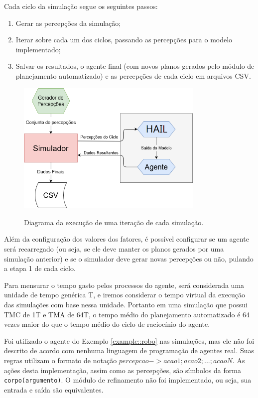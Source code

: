 Cada ciclo da simulação segue os seguintes passos:

\begin{enumerate}
    \item Gerar as percepções da simulação;
    \item Iterar sobre cada um dos ciclos, passando as percepções para o modelo implementado;
    \item Salvar os resultados, o agente final (com novos planos gerados pelo módulo de planejamento automatizado) e as percepções de cada ciclo em arquivos CSV.
\end{enumerate}

\begin{figure}[h!]
    \centering
    \caption{Diagrama da execução de uma iteração de cada simulação.}
    \includegraphics[width=0.8\textwidth]{images/diagrama-simulacao.png}
    \label{fig:diagrama-simulacao}
\end{figure}

Além da configuração dos valores dos fatores, é possível configurar se um agente será recarregado (ou seja, se ele deve manter os planos gerados por uma simulação anterior) e se o simulador deve gerar novas percepções ou não, pulando a etapa 1 de cada ciclo.

Para mensurar o tempo gasto pelos processos do agente, será considerada uma unidade de tempo genérica T, e iremos considerar o tempo virtual da execução das simulações com base nessa unidade. Portanto em uma simulação que possui TMC de 1T e TMA de 64T, o tempo médio do planejamento automatizado é 64 vezes maior do que o tempo médio do ciclo de raciocínio do agente.

Foi utilizado o agente do Exemplo \ref{example::robo} nas simulações, mas ele não foi descrito de acordo com nenhuma linguagem de programação de agentes real. Suas regras utilizam o formato de notação $percepcao -> acao1; acao2; ...; acaoN$. As ações desta implementação, assim como as percepções, são símbolos da forma \texttt{corpo(argumento)}. O módulo de refinamento não foi implementado, ou seja, sua entrada e saída são equivalentes.

